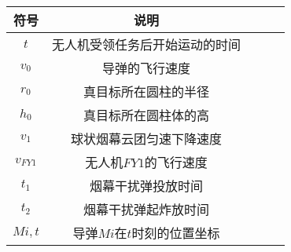 \documentclass[../main.tex]{subfiles}
\begin{document}




\begin{table}[H]
\centering
\tabcolsep=2cm%
\begin{tabular}{ccccc}
\toprule[1.5pt]
符号 & 说明  \\ 
\midrule[1pt]
$t$            & 无人机受领任务后开始运动的时间            \\
$ v_0 $        & 导弹的飞行速度                          \\
$r_0$          &真目标所在圆柱的半径                      \\
$h_0$          &真目标所在圆柱体的高                      \\
$v_1$          &球状烟幕云团匀速下降速度                   \\
$v_{FY1}$      &无人机\( FY1 \)的飞行速度                 \\
$t_1$          &烟幕干扰弹投放时间                        \\
$t_2$          &烟幕干扰弹起炸放时间                      \\
$Mi,t$         &导弹$Mi$在$t$时刻的位置坐标               \\








\bottomrule[1.5pt]
\end{tabular}
\end{table}
\end{document}
